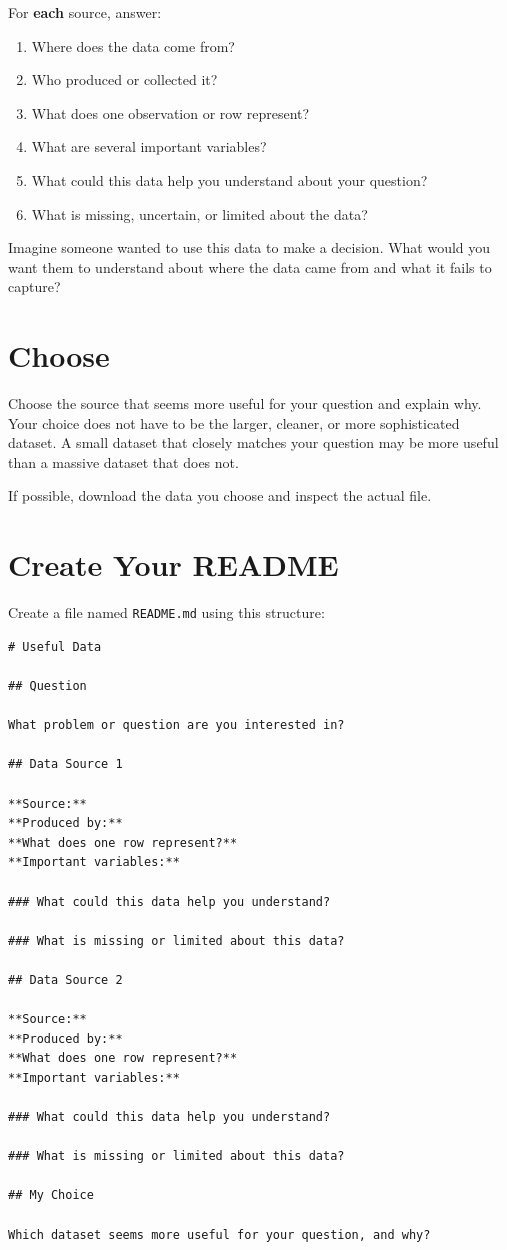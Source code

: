 \documentclass[11pt]{article}
\begin{document}
For \textbf{each} source, answer:

\begin{enumerate}[leftmargin=*,itemsep=8pt]
  \item Where does the data come from?
  \item Who produced or collected it?
  \item What does one observation or row represent?
  \item What are several important variables?
  \item What could this data help you understand about your question?
  \item What is missing, uncertain, or limited about the data?
\end{enumerate}

\begin{designprompt}
Imagine someone wanted to use this data to make a decision. What would you
want them to understand about where the data came from and what it fails to
capture?
\end{designprompt}

\section{Choose}

Choose the source that seems more useful for your question and explain why.
Your choice does not have to be the larger, cleaner, or more sophisticated
dataset. A small dataset that closely matches your question may be more useful
than a massive dataset that does not.

If possible, download the data you choose and inspect the actual file.

\section{Create Your README}

Create a file named \texttt{README.md} using this structure:

\begin{verbatim}
# Useful Data

## Question

What problem or question are you interested in?

## Data Source 1

**Source:**
**Produced by:**
**What does one row represent?**
**Important variables:**

### What could this data help you understand?

### What is missing or limited about this data?

## Data Source 2

**Source:**
**Produced by:**
**What does one row represent?**
**Important variables:**

### What could this data help you understand?

### What is missing or limited about this data?

## My Choice

Which dataset seems more useful for your question, and why?
\end{verbatim}
\end{document}
